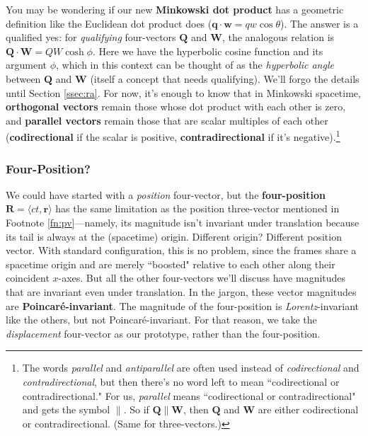 \documentclass[12pt]{article}
\renewcommand{\vv}[1]{\mathbf{#1}}
\begin{document}
You may be wondering if our new \textbf{Minkowski dot product} has a geometric definition like the Euclidean dot product does ($\vv q \cdot \vv w = qw \cos \theta$). The answer is a qualified yes: for \emph{qualifying} four-vectors $\vv Q$ and $\vv W$, the analogous relation is $\vv Q \cdot \vv W = QW \cosh \phi$. Here we have the hyperbolic cosine function and its argument $\phi$, which in this context can be thought of as the \emph{hyperbolic angle} between $\vv Q$ and $\vv W$ (itself a concept that needs qualifying). We'll forgo the details until Section \ref{ssec:ra}. For now, it's enough to know that in Minkowski spacetime, \textbf{orthogonal vectors} remain those whose dot product with each other is zero, and \textbf{parallel vectors} remain those that are scalar multiples of each other (\textbf{codirectional} if the scalar is positive, \textbf{contradirectional} if it's negative).\footnote{The words \emph{parallel} and \emph{antiparallel} are often used instead of \emph{codirectional} and \emph{contradirectional}, but then there's no word left to mean ``codirectional or contradirectional." For us, \emph{parallel} means ``codirectional or contradirectional" and gets the symbol $\parallel$. So if $\vv Q \parallel \vv W$, then $\vv Q$ and $\vv W$ are either codirectional or contradirectional. (Same for three-vectors.)}


\subsubsection{Four-Position?}

We could have started with a \emph{position} four-vector, but the \textbf{four-position} $\vv R = \langle ct, \vv r \rangle$ has the same limitation as the position three-vector mentioned in Footnote \ref{fn:pv}---namely, its magnitude isn't invariant under translation because its tail is always at the (spacetime) origin. Different origin? Different position vector. With standard configuration, this is no problem, since the frames share a spacetime origin and are merely ``boosted" relative to each other along their coincident $x$-axes. But all the other four-vectors we'll discuss have magnitudes that are invariant even under translation. In the jargon, these vector magnitudes are \textbf{Poincar\'e-invariant}. The magnitude of the four-position is \emph{Lorentz}-invariant like the others, but not Poincar\'e-invariant. For that reason, we take the \emph{displacement} four-vector as our prototype, rather than the four-position.
\end{document}
